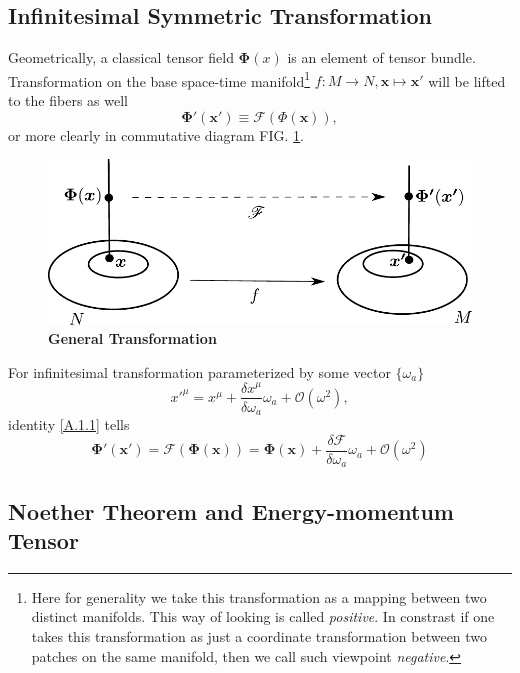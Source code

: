\documentclass[10pt,nofootinbib]{revtex4}
\begin{document}
	\subsection{Infinitesimal Symmetric Transformation}
		Geometrically, a classical tensor field $\bm{\Phi}(x)$ is an element of tensor bundle. Transformation on the base space-time manifold\footnote{Here for generality we take this transformation as a mapping between two distinct manifolds. This way of looking is called \emph{positive}. In constrast if one takes this transformation as just a coordinate transformation between two patches on the same manifold, then we call such viewpoint \emph{negative}.} $f:M\rightarrow N, \bm{x}\mapsto \bm{x'}$ will be lifted to the fibers as well
		\begin{equation}\label{A.1.1}
			\bm{\Phi'}(\bm{x'})\equiv \mathscr{F}(\Phi(\bm{x})),
		\end{equation}
		or more clearly in commutative diagram FIG. \ref{fig: transformation}.\par
		\begin{figure}[!htp]
			\centering
			\includegraphics[scale=0.8]{transformation.pdf}
			\caption{{\bf General Transformation}}
			\label{fig: transformation}
		\end{figure}
		For infinitesimal transformation parameterized by some vector $\{\omega_a\}$
		\begin{equation*}
			x'^\mu=x^\mu+\dfrac{\delta x^\mu}{\delta\omega_a}\omega_a+\mathcal{O}(\omega^2),
		\end{equation*}
		identity \eqref{A.1.1} tells
		\begin{equation}\label{A.1.2}
			\bm{\Phi'}(\bm{x'})=\mathscr{F}(\bm{\Phi}(\bm{x}))=\bm{\Phi}(\bm{x})+\dfrac{\delta\mathscr{F}}{\delta\omega_a}\omega_a+\mathcal{O}(\omega^2)
		\end{equation}
		
	\subsection{Noether Theorem and Energy-momentum Tensor}

\end{document}
